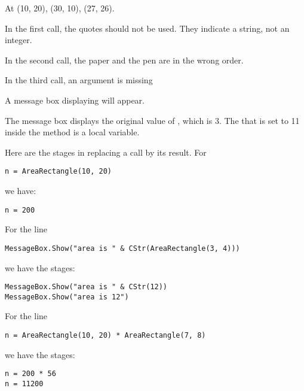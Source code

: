 		\begin{stab}
			\begin{enumChapter}
				\item	At (10, 20), (30, 10), (27, 26).
				\item In the first call, the quotes should not be used. They indicate a string, not an integer.

						In the second call, the paper and the pen are in the wrong order.

						In the third call, an argument is missing
				\item A message box displaying  will appear.
				\item The message box displays the original value of , which is 3. The  that is set to 11 inside the method is a local variable.
				\item Here are the stages in replacing a call by its result. For
					\begin{lstlisting}
n = AreaRectangle(10, 20)
					\end{lstlisting}
					we have:
					\begin{lstlisting}
n = 200
					\end{lstlisting}
					For the line
					\begin{lstlisting}
MessageBox.Show("area is " & CStr(AreaRectangle(3, 4)))
					\end{lstlisting}
					we have the stages:
					\begin{lstlisting}
MessageBox.Show("area is " & CStr(12))
MessageBox.Show("area is 12")
					\end{lstlisting}
					For the line
					\begin{lstlisting}
n = AreaRectangle(10, 20) * AreaRectangle(7, 8)
					\end{lstlisting}
					we have the stages:
					\begin{lstlisting}
n = 200 * 56
n = 11200
					\end{lstlisting}


\end{enumChapter}
\end{stab}

